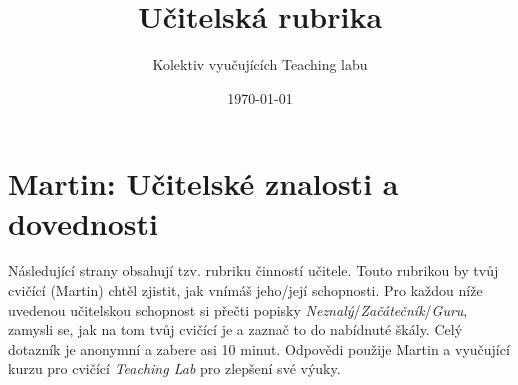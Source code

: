\documentclass{article}
\title{Učitelská rubrika}
\author{Kolektiv vyučujících Teaching labu}
\date{\today}
\newcommand{\teacherName}{Martin\xspace}
\begin{document}
\section*{\teacherName: Učitelské znalosti a dovednosti}
\label{rubric}

\begin{onehalfspace}
\large 
Následující strany obsahují tzv. rubriku činností učitele. Touto rubrikou by tvůj cvičící (\teacherName) chtěl zjistit, jak vnímáš jeho/její schopnosti. Pro každou níže uvedenou učitelskou schopnost si přečti popisky \textit{Neznalý}/\textit{Začátečník}/\textit{Guru}, zamysli se, jak na tom tvůj cvičící je a zaznač to do nabídnuté škály. Celý dotazník je anonymní a zabere asi 10 minut. Odpovědi použije \teacherName a vyučující kurzu pro cvičící \textit{Teaching Lab} pro zlepšení své výuky.
\end{onehalfspace}
\bigskip
\end{document}
